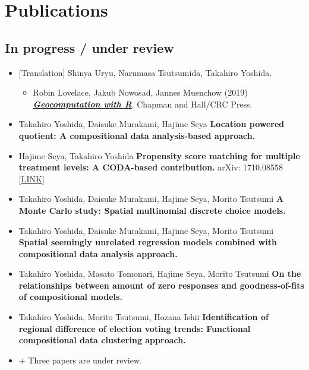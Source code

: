 \documentclass[
]{book}
\providecommand{\tightlist}{%
  \setlength{\itemsep}{0pt}\setlength{\parskip}{0pt}}
\begin{document}
\hypertarget{publications}{%
\chapter*{Publications}\label{publications}}

\hypertarget{in-progress-under-review}{%
\section*{In progress / under review}\label{in-progress-under-review}}

\begin{itemize}
\tightlist
\item
  {[}Translation{]} Shinya Uryu, Narumasa Tsutsumida, Takahiro Yoshida.

  \begin{itemize}
  \tightlist
  \item
    Robin Lovelace, Jakub Nowosad, Jannes Muenchow (2019)
    \textbf{\emph{\href{https://geocompr.robinlovelace.net/}{Geocomputation with R}}}. Chapman and Hall/CRC Press.
  \end{itemize}
\item
  Takahiro Yoshida, Daisuke Murakami, Hajime Seya
  \textbf{Location powered quotient: A compositional data analysis-based approach.}
\item
  Hajime Seya, Takahiro Yoshida
  \textbf{Propensity score matching for multiple treatment levels: A CODA-based contribution.}
  arXiv: 1710.08558 {[}\href{https://arxiv.org/abs/1710.08558}{LINK}{]}
\item
  Takahiro Yoshida, Daisuke Murakami, Hajime Seya, Morito Tsutsumi
  \textbf{A Monte Carlo study: Spatial multinomial discrete choice models.}
\item
  Takahiro Yoshida, Daisuke Murakami, Hajime Seya, Morito Tsutsumi
  \textbf{Spatial seemingly unrelated regression models combined with compositional data analysis approach.}
\item
  Takahiro Yoshida, Masato Tomonari, Hajime Seya, Morito Tsutsumi
  \textbf{On the relationships between amount of zero responses and goodness-of-fits of compositional models.}
\item
  Takahiro Yoshida, Morito Tsutsumi, Hozana Ishii
  \textbf{Identification of regional difference of election voting trends: Functional compositional data clustering approach.}
\item
  + Three papers are under review.
\end{itemize}
\end{document}
